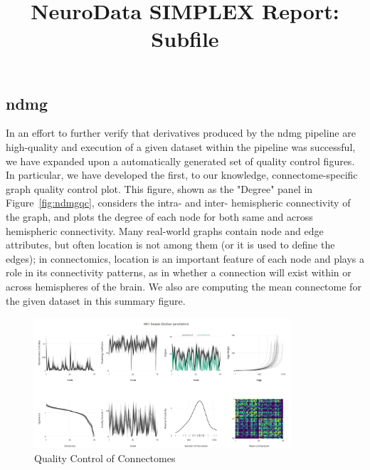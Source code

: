 \documentclass[simplex.tex]{subfiles}
\title{NeuroData SIMPLEX Report: Subfile}
\begin{document}


\subsection{ndmg}

In an effort to further verify that derivatives produced by the ndmg pipeline are high-quality and execution of a
given dataset within the pipeline was successful, we have expanded upon a automatically generated set of quality
control figures. In particular, we have developed the first, to our knowledge, connectome-specific graph quality
control plot. This figure, shown as the "Degree" panel in Figure~\ref{fig:ndmgqc}, considers the intra- and inter-
hemispheric connectivity of the graph, and plots the degree of each node for both same and across hemispheric
connectivity. Many real-world graphs contain node and edge attributes, but often location is not among them (or it
is used to define the edges); in connectomics, location is an important feature of each node and plays a role in its
connectivity patterns, as in whether a connection will exist within or across hemispheres of the brain. We also are
computing the mean connectome for the given dataset in this summary figure.

\begin{figure}[h!]
\begin{cframed}
\centering
\includegraphics[width=0.85\textwidth]{../../figs/ndmgqcnew.png}
\caption{Quality Control of Connectomes}
\label{fig:ndmg}
\end{cframed}
\end{figure}
\end{document}
